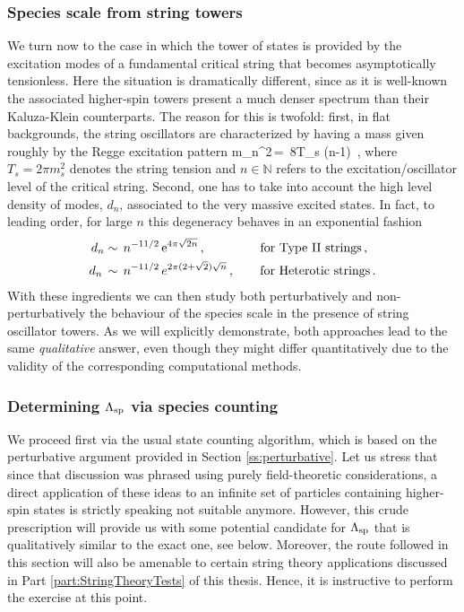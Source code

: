 \subsubsection{Species scale from string towers}\label{sss:stringtowersspecies}
	
We turn now to the case in which the tower of states is provided by the excitation modes of a fundamental critical string that becomes asymptotically tensionless. Here the situation is dramatically different, since as it is well-known the associated higher-spin towers present a much denser spectrum than their Kaluza-Klein counterparts. The reason for this is twofold: first, in flat backgrounds, the string oscillators are characterized by having a mass given roughly by the Regge excitation pattern 
%
\beq
	m_n^2\,=\, 8\pi T_s \left(n-1\right)\, ,
\label{eq:stringmasses}
\eeq
%
where $T_s=2 \pi m_s^2$ denotes the string tension and $n \in \mathbb{N}$ refers to the excitation/oscillator level of the critical string. Second, one has to take into account the high level density of modes, $d_n$, associated to the very massive excited states. In fact, to leading order, for large $n$  this degeneracy behaves in an exponential fashion \cite{Green:2012oqa}
%
\begin{align}\label{eq:exactleveldensitystrings}
     d_n & \sim\, n^{-11/2}\, {\rm e}^{4\pi \sqrt{2n}}\, , \qquad \qquad \ \text{for Type II strings}\, , \notag\\
     d_n\, &\sim\, n^{-11/2}\, e^{2 \pi (2+\sqrt{2}) \sqrt{n}}\, , \qquad \text{for Heterotic strings}\, .
\end{align}
%
With these ingredients we can then study both perturbatively and non-perturbatively the behaviour of the species scale in the presence of string oscillator towers. As we will explicitly demonstrate, both approaches lead to the same \emph{qualitative} answer, even though they might differ quantitatively due to the validity of the corresponding computational methods.

\subsubsection*{Determining $\Lambda_{\text{sp}}$ via species counting}
	
We proceed first via the usual state counting algorithm, which is based on the perturbative argument provided in Section \ref{ss:perturbative}. Let us stress that since that discussion was phrased using purely field-theoretic considerations, a direct application of these ideas to an infinite set of particles containing higher-spin states is strictly speaking not suitable anymore. However, this crude prescription will provide us with some potential candidate for $\Lambda_{\text{sp}}$ that is qualitatively similar to the exact one, see below. Moreover, the route followed in this section will also be amenable to certain string theory applications discussed in Part \ref{part:StringTheoryTests} of this thesis. Hence, it is instructive to perform the exercise at this point.

